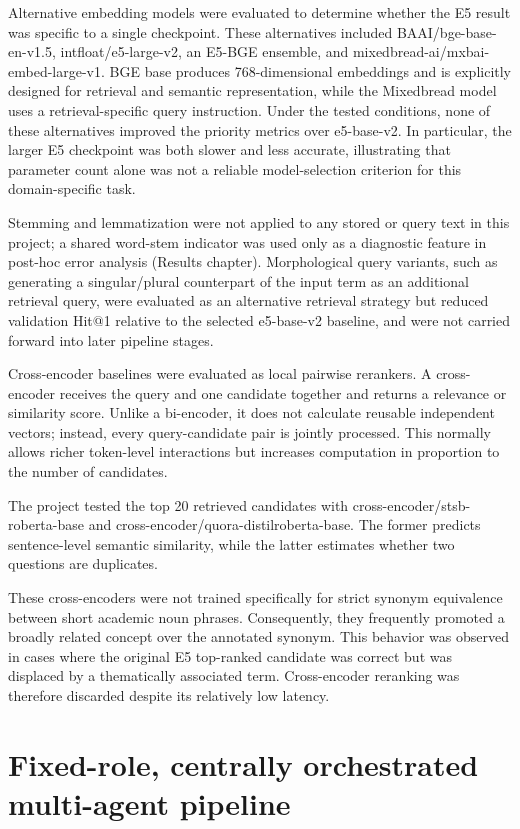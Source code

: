 Alternative embedding models were evaluated to determine whether the E5 result was specific to a single checkpoint. These alternatives included BAAI/bge-base-en-v1.5, intfloat/e5-large-v2, an E5-BGE ensemble, and mixedbread-ai/mxbai-embed-large-v1. BGE base produces 768-dimensional embeddings and is explicitly designed for retrieval and semantic representation, while the Mixedbread model uses a retrieval-specific query instruction. Under the tested conditions, none of these alternatives improved the priority metrics over e5-base-v2. In particular, the larger E5 checkpoint was both slower and less accurate, illustrating that parameter count alone was not a reliable model-selection criterion for this domain-specific task.

Stemming and lemmatization were not applied to any stored or query text in this project; a shared word-stem indicator was used only as a diagnostic feature in post-hoc error analysis (Results chapter). Morphological query variants, such as generating a singular/plural counterpart of the input term as an additional retrieval query, were evaluated as an alternative retrieval strategy but reduced validation Hit@1 relative to the selected e5-base-v2 baseline, and were not carried forward into later pipeline stages.

Cross-encoder baselines were evaluated as local pairwise rerankers. A cross-encoder receives the query and one candidate together and returns a relevance or similarity score. Unlike a bi-encoder, it does not calculate reusable independent vectors; instead, every query-candidate pair is jointly processed. This normally allows richer token-level interactions but increases computation in proportion to the number of candidates.

The project tested the top 20 retrieved candidates with cross-encoder/stsb-roberta-base and cross-encoder/quora-distilroberta-base. The former predicts sentence-level semantic similarity, while the latter estimates whether two questions are duplicates.

These cross-encoders were not trained specifically for strict synonym equivalence between short academic noun phrases. Consequently, they frequently promoted a broadly related concept over the annotated synonym. This behavior was observed in cases where the original E5 top-ranked candidate was correct but was displaced by a thematically associated term. Cross-encoder reranking was therefore discarded despite its relatively low latency.

\section{Fixed-role, centrally orchestrated multi-agent pipeline}

